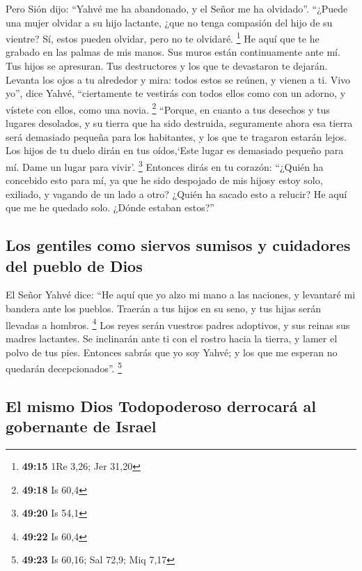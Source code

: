  Pero Sión dijo: ``Yahvé me ha abandonado, y el Señor me
ha olvidado''.  ``¿Puede una mujer olvidar a su hijo
lactante, ¿que no tenga compasión del hijo de su vientre? Sí, estos
pueden olvidar, pero no te olvidaré. \footnote{\textbf{49:15} 1Re 3,26;
  Jer 31,20}  He aquí que te he grabado en las palmas de
mis manos. Sus muros están continuamente ante mí.  Tus
hijos se apresuran. Tus destructores y los que te devastaron te dejarán.
 Levanta los ojos a tu alrededor y mira: todos estos se
reúnen, y vienen a ti. Vivo yo'', dice Yahvé, ``ciertamente te vestirás
con todos ellos como con un adorno, y vístete con ellos, como una novia.
\footnote{\textbf{49:18} Is 60,4}  ``Porque, en cuanto a
tus desechos y tus lugares desolados, y su tierra que ha sido destruida,
seguramente ahora esa tierra será demasiado pequeña para los habitantes,
y los que te tragaron estarán lejos.  Los hijos de tu
duelo dirán en tus oídos,`Este lugar es demasiado pequeño para mí. Dame
un lugar para vivir'. \footnote{\textbf{49:20} Is 54,1} 
Entonces dirás en tu corazón: ``¿Quién ha concebido esto para mí, ya que
he sido despojado de mis hijosy estoy solo, exiliado, y vagando de un
lado a otro? ¿Quién ha sacado esto a relucir? He aquí que me he quedado
solo. ¿Dónde estaban estos?''

\hypertarget{los-gentiles-como-siervos-sumisos-y-cuidadores-del-pueblo-de-dios}{%
\subsection{Los gentiles como siervos sumisos y cuidadores del pueblo de
Dios}\label{los-gentiles-como-siervos-sumisos-y-cuidadores-del-pueblo-de-dios}}

 El Señor Yahvé dice: ``He aquí que yo alzo mi mano a las
naciones, y levantaré mi bandera ante los pueblos. Traerán a tus hijos
en su seno, y tus hijas serán llevadas a hombros. \footnote{\textbf{49:22}
  Is 60,4}  Los reyes serán vuestros padres adoptivos, y
sus reinas sus madres lactantes. Se inclinarán ante ti con el rostro
hacia la tierra, y lamer el polvo de tus pies. Entonces sabrás que yo
soy Yahvé; y los que me esperan no quedarán decepcionados''. \footnote{\textbf{49:23}
  Is 60,16; Sal 72,9; Miq 7,17}

\hypertarget{el-mismo-dios-todopoderoso-derrocaruxe1-al-gobernante-de-israel}{%
\subsection{El mismo Dios Todopoderoso derrocará al gobernante de
Israel}\label{el-mismo-dios-todopoderoso-derrocaruxe1-al-gobernante-de-israel}}

